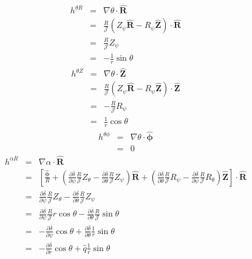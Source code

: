 \documentclass{llncs}
\newcommand{\tmmathbf}[1]{\ensuremath{\boldsymbol{#1}}}
\begin{document}
\begin{eqnarray*}
  h^{\theta R} & = & \nabla \theta \cdot \hat{\mathbf{R}}\\
  & = & \frac{R}{\mathcal{J}} (Z_{\psi} \hat{\mathbf{R}} - R_{\psi}
  \hat{\mathbf{Z}}) \cdot \hat{\mathbf{R}}\\
  & = & \frac{R}{\mathcal{J}} Z_{\psi}\\
  & = & - \frac{1}{r} \sin \theta
\end{eqnarray*}
\begin{eqnarray*}
  h^{\theta Z} & = & \nabla \theta \cdot \hat{\mathbf{Z}}\\
  & = & \frac{R}{\mathcal{J}} (Z_{\psi} \hat{\mathbf{R}} - R_{\psi}
  \hat{\mathbf{Z}}) \cdot \hat{\mathbf{Z}}\\
  & = & - \frac{R}{\mathcal{J}} R_{\psi}\\
  & = & \frac{1}{r} \cos \theta
\end{eqnarray*}
\begin{eqnarray*}
  h^{\theta \phi} & = & \nabla \theta \cdot \hat{\tmmathbf{\phi}}\\
  & = & 0
\end{eqnarray*}
\begin{eqnarray*}
  h^{\alpha R} & = & \nabla \alpha \cdot \hat{\mathbf{R}}\\
  & = & \left[ \frac{\hat{\tmmathbf{\phi}}}{R} + \left( \frac{\partial
  \overline{\delta}}{\partial \psi} \frac{R}{\mathcal{J}} Z_{\theta} -
  \frac{\partial \overline{\delta}}{\partial \theta} \frac{R}{\mathcal{J}}
  Z_{\psi} \right) \hat{\mathbf{R}} + \left( \frac{\partial
  \overline{\delta}}{\partial \theta} \frac{R}{\mathcal{J}} R_{\psi} -
  \frac{\partial \overline{\delta}}{\partial \psi} \frac{R}{\mathcal{J}}
  R_{\theta} \right) \hat{\mathbf{Z}} \right] \cdot \hat{\mathbf{R}}\\
  & = & \frac{\partial \overline{\delta}}{\partial \psi}
  \frac{R}{\mathcal{J}} Z_{\theta} - \frac{\partial
  \overline{\delta}}{\partial \theta} \frac{R}{\mathcal{J}} Z_{\psi}\\
  & = & \frac{\partial \overline{\delta}}{\partial \psi}
  \frac{R}{\mathcal{J}} r \cos \theta - \frac{\partial
  \overline{\delta}}{\partial \theta} \frac{R}{\mathcal{J}} \sin \theta\\
  & = & - \frac{\partial \overline{\delta}}{\partial \psi} \cos \theta +
  \frac{\partial \overline{\delta}}{\partial \theta} \frac{1}{r} \sin \theta\\
  & = & - \frac{\partial \overline{\delta}}{\partial r} \cos \theta + \hat{q}
  \frac{1}{r} \sin \theta
\end{eqnarray*}
\end{document}
